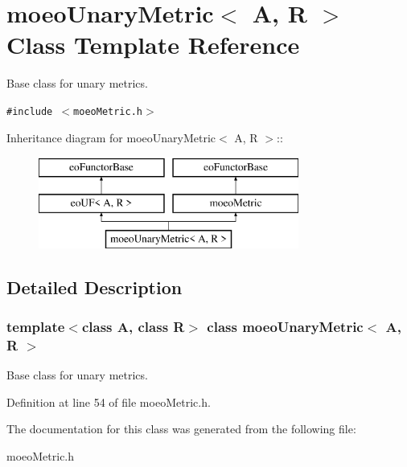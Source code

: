 \section{moeo\-Unary\-Metric$<$ A, R $>$ Class Template Reference}
\label{classmoeoUnaryMetric}
Base class for unary metrics.  


{\tt \#include $<$moeo\-Metric.h$>$}

Inheritance diagram for moeo\-Unary\-Metric$<$ A, R $>$::\begin{figure}[H]
\begin{center}
\leavevmode
\includegraphics[height=3cm]{classmoeoUnaryMetric}
\end{center}
\end{figure}


\subsection{Detailed Description}
\subsubsection*{template$<$class A, class R$>$ class moeo\-Unary\-Metric$<$ A, R $>$}

Base class for unary metrics. 



Definition at line 54 of file moeo\-Metric.h.

The documentation for this class was generated from the following file:\begin{CompactItemize}
\item 
moeo\-Metric.h\end{CompactItemize}
